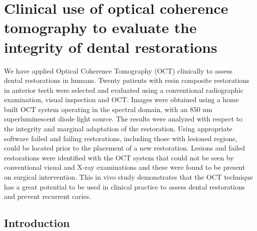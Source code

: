 \documentclass[12pt,twoside,english]{book}
\renewcommand{\~}{\perispomeni}%
\numberwithin{equation}{section}
\numberwithin{figure}{section}
\begin{document}
\section[Clinical use of OCT to evaluate dental restorations]{Clinical use of optical coherence tomography to evaluate the integrity of dental restorations}

We have applied Optical Coherence Tomography (OCT) clinically to assess dental restorations in humans. Twenty patients with resin composite restorations in anterior teeth were selected and evaluated using a conventional radiographic examination, visual inspection and OCT. Images were obtained using a home built OCT system operating in the spectral domain, with an 850 nm superluminescent diode light source. The results were analyzed with respect to the integrity and marginal adaptation of the restoration. Using appropriate software failed and failing restorations, including those with lesioned regions, could be located prior to the placement of a new restoration. Lesions and failed restorations were identified with the OCT system that could not be seen by conventional visual and X-ray examinations and these were found to be present on surgical intervention. This in vivo study demonstrates that the OCT technique has a great potential to be used in clinical practice to assess dental restorations and prevent recurrent caries. 

\subsection{Introduction}

\end{document}
